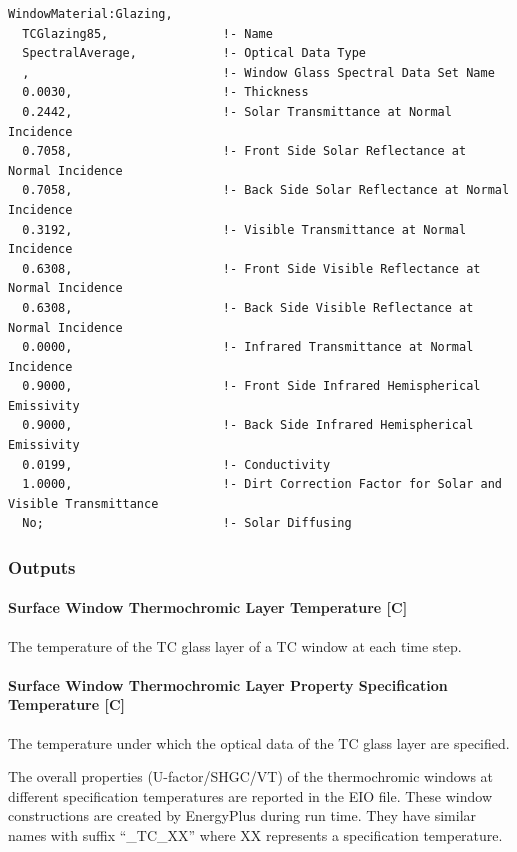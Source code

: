 \begin{lstlisting}
WindowMaterial:Glazing,
  TCGlazing85,                !- Name
  SpectralAverage,            !- Optical Data Type
  ,                           !- Window Glass Spectral Data Set Name
  0.0030,                     !- Thickness
  0.2442,                     !- Solar Transmittance at Normal Incidence
  0.7058,                     !- Front Side Solar Reflectance at Normal Incidence
  0.7058,                     !- Back Side Solar Reflectance at Normal Incidence
  0.3192,                     !- Visible Transmittance at Normal Incidence
  0.6308,                     !- Front Side Visible Reflectance at Normal Incidence
  0.6308,                     !- Back Side Visible Reflectance at Normal Incidence
  0.0000,                     !- Infrared Transmittance at Normal Incidence
  0.9000,                     !- Front Side Infrared Hemispherical Emissivity
  0.9000,                     !- Back Side Infrared Hemispherical Emissivity
  0.0199,                     !- Conductivity
  1.0000,                     !- Dirt Correction Factor for Solar and Visible Transmittance
  No;                         !- Solar Diffusing
\end{lstlisting}

\subsubsection{Outputs}\label{outputs-3-019}

\paragraph{Surface Window Thermochromic Layer Temperature {[}C{]}}\label{surface-window-thermochromic-layer-temperature-c}

The temperature of the TC glass layer of a TC window at each time step.

\paragraph{Surface Window Thermochromic Layer Property Specification Temperature {[}C{]}}\label{surface-window-thermochromic-layer-property-specification-temperature-c}

The temperature under which the optical data of the TC glass layer are specified.

The overall properties (U-factor/SHGC/VT) of the thermochromic windows at different specification temperatures are reported in the EIO file. These window constructions are created by EnergyPlus during run time. They have similar names with suffix ``\_TC\_XX'' where XX represents a specification temperature.

